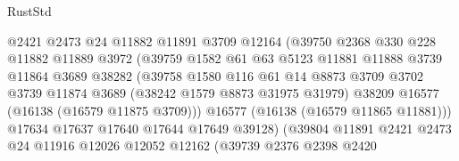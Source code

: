 \begin{lexlean}{RustStd}
\begin{coremodule}
                                @2421
                                @2473
                                @24
                                @11882
                                @11891
                                @3709
                                @12164
                                (@39750
                                  @2368
                                  @330
                                  @228
                                  @11882
                                  @11889
                                  @3972
                                  (@39759
                                    @1582
                                    @61
                                    @63
                                    @5123
                                    @11881
                                    @11888
                                    @3739
                                    @11864
                                    @3689
                                    @38282
                                    (@39758
                                      @1580
                                      @116
                                      @61
                                      @14
                                      @8873
                                      @3709
                                      @3702
                                      @3739
                                      @11874
                                      @3689
                                      (@38242 @1579 @8873 @31975 @31979)
                                      @38209
                                      @16577
                                      (@16138 (@16579 @11875 @3709)))
                                    @16577
                                    (@16138 (@16579 @11865 @11881)))
                                  @17634
                                  @17637
                                  @17640
                                  @17644
                                  @17649
                                  @39128)
                                (@39804
                                  @11891
                                  @2421
                                  @2473
                                  @24
                                  @11916
                                  @12026
                                  @12052
                                  @12162
                                  (@39739
                                    @2376
                                    @2398
                                    @2420

\end{coremodule}
\end{lexlean}
